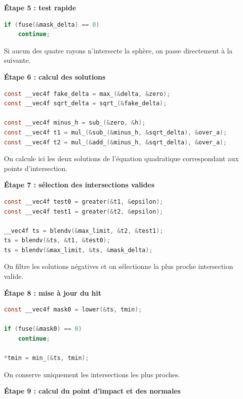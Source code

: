 \medskip

\textbf{Étape 5 : test rapide}

\begin{lstlisting}[language=C]
if (fuse(&mask_delta) == 0)
    continue;
\end{lstlisting}

Si aucun des quatre rayons n'intersecte la sphère, on passe directement à la suivante.

\medskip

\textbf{Étape 6 : calcul des solutions}

\begin{lstlisting}[language=C]
const __vec4f fake_delta = max_(&delta, &zero);
const __vec4f sqrt_delta = sqrt_(&fake_delta);

const __vec4f minus_h = sub_(&zero, &h);
const __vec4f t1 = mul_(&sub_(&minus_h, &sqrt_delta), &over_a);
const __vec4f t2 = mul_(&add_(&minus_h, &sqrt_delta), &over_a);
\end{lstlisting}

On calcule ici les deux solutions de l'équation quadratique correspondant aux points d'intersection.

\medskip

\textbf{Étape 7 : sélection des intersections valides}

\begin{lstlisting}[language=C]
const __vec4f test0 = greater(&t1, &epsilon);
const __vec4f test1 = greater(&t2, &epsilon);

__vec4f ts = blendv(&max_limit, &t2, &test1);
ts = blendv(&ts, &t1, &test0);
ts = blendv(&max_limit, &ts, &mask_delta);
\end{lstlisting}

On filtre les solutions négatives et on sélectionne la plus proche intersection valide.

\medskip

\textbf{Étape 8 : mise à jour du hit}

\begin{lstlisting}[language=C]
const __vec4f mask0 = lower(&ts, tmin);

if (fuse(&mask0) == 0)
    continue;

*tmin = min_(&ts, tmin);
\end{lstlisting}

On conserve uniquement les intersections les plus proches.

\medskip

\textbf{Étape 9 : calcul du point d'impact et des normales}

